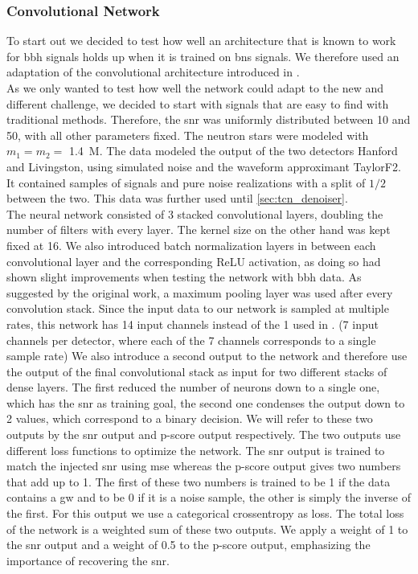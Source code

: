 \subsubsection{Convolutional Network}\label{sec:evolution_convolution}
To start out we decided to test how well an architecture that is known to work for \gls{bbh} signals holds up when it is trained on \gls{bns} signals. We therefore used an adaptation of the convolutional architecture introduced in \cite{huerta_parameter_estimation}.\\
As we only wanted to test how well the network could adapt to the new and different challenge, we decided to start with signals that are easy to find with traditional methods. Therefore, the \gls{snr} was uniformly distributed between 10 and 50, with all other parameters fixed. The neutron stars were modeled with $m_1=m_2=$ \SI{1.4}{M_\odot}. The data modeled the output of the two detectors Hanford and Livingston, using simulated noise and the waveform approximant TaylorF2. It contained samples of signals and pure noise realizations with a split of $1/2$ between the two. This data was further used until \autoref{sec:tcn_denoiser}.\\
The neural network consisted of 3 stacked convolutional layers, doubling the number of filters with every layer. The kernel size on the other hand was kept fixed at 16. We also introduced batch normalization layers in between each convolutional layer and the corresponding ReLU activation, as doing so had shown slight improvements when testing the network with \gls{bbh} data. As suggested by the original work, a maximum pooling layer was used after every convolution stack. Since the input data to our network is sampled at multiple rates, this network has 14 input channels instead of the 1 used in \cite{huerta_parameter_estimation}. (7 input channels per detector, where each of the 7 channels corresponds to a single sample rate) We also introduce a second output to the network and therefore use the output of the final convolutional stack as input for two different stacks of dense layers. The first reduced the number of neurons down to a single one, which has the \gls{snr} as training goal, the second one condenses the output down to 2 values, which correspond to a binary decision. We will refer to these two outputs by the \gls{snr} output and p-score output respectively. The two outputs use different loss functions to optimize the network. The \gls{snr} output is trained to match the injected \gls{snr} using \gls{mse} whereas the p-score output gives two numbers that add up to 1. The first of these two numbers is trained to be 1 if the data contains a \gls{gw} and to be 0 if it is a noise sample, the other is simply the inverse of the first. For this output we use a categorical crossentropy as loss. The total loss of the network is a weighted sum of these two outputs. We apply a weight of 1 to the \gls{snr} output and a weight of 0.5 to the p-score output, emphasizing the importance of recovering the \gls{snr}.\\
